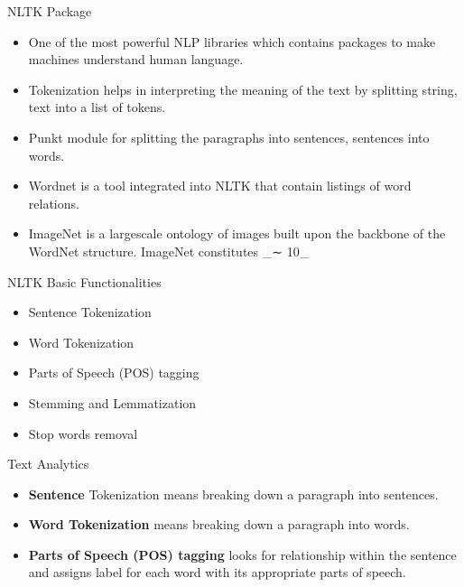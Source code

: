 \documentclass[aspectratio=169,12pt]{beamer}
\begin{document}
\begin{frame}[t]{NLTK Package}
\begin{itemize}
\itemsep0em 
\item One of the most powerful NLP libraries which contains packages to make machines understand human language.
\item Tokenization helps in interpreting the meaning of the text by splitting string, text into a list of tokens. 
\item Punkt module for splitting the paragraphs into sentences, sentences into words. 
\item Wordnet is a tool integrated into NLTK that contain listings of word relations.
\item ImageNet is a largescale ontology of images built upon the backbone of the WordNet structure. ImageNet constitutes \_∼ 10\_%
\end{itemize}
\end{frame}

\begin{frame}[t]{NLTK Basic Functionalities}
\begin{itemize}
\itemsep1em 
\item Sentence Tokenization
\item Word Tokenization
\item Parts of Speech (POS) tagging
\item Stemming and Lemmatization
\item Stop words removal
\end{itemize}
\end{frame}

\begin{frame}[t]{Text Analytics}
\begin{itemize}
\itemsep2em 
\item \textbf{Sentence} Tokenization means breaking down a paragraph into sentences.
\item \textbf{Word Tokenization} means breaking down a paragraph into words.
\item \textbf{Parts of Speech (POS) tagging} looks for relationship within the sentence and assigns label for each word with
its appropriate parts of speech. 
\end{itemize}
\end{frame}
\end{document}

